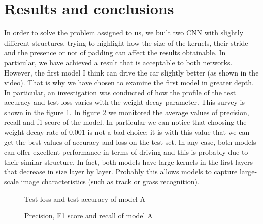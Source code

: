 \section{Results and conclusions}
In order to solve the problem assigned to us, we built two CNN with slightly different structures, trying to highlight how the size of the kernels, their stride and the presence or not of padding can affect the results obtainable. In particular, we have achieved a result that is acceptable to both networks. However, the first model I think can drive the car slightly better (as shown in the \href{https://youtu.be/xVTm94bYn78}{video}). That is why we have chosen to examine the first model in greater depth. In particular, an investigation was conducted of how the profile of the test accuracy and test loss varies with the weight decay parameter. This survey is shown in the figure \ref{fig:h1}. In figure \ref{fig:h2} we monitored the average values of precision, recall and f1-score of the model. In particular we can notice that choosing the weight decay rate of $0.001$ is not a bad choice; it is with this value that we can get the best values of accuracy and loss on the test set. In any case, both models can offer excellent performance in terms of driving and this is probably due to their similar structure. In fact, both models have large kernels in the first layers that decrease in size layer by layer. Probably this allows models to capture large-scale image characteristics (such as track or grass recognition).
\begin{figure}[h!]
    \hUno
    \caption{Test loss and test accuracy of model A}
    \label{fig:h1}
\end{figure}
\begin{figure}[h!]
    \hDue
    \caption{Precision, F1 score and recall of model A}
    \label{fig:h2}
\end{figure}